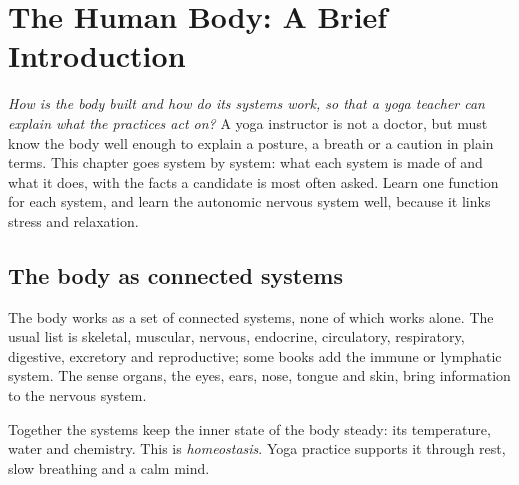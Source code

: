 \chapter{The Human Body: A Brief Introduction}
\label{ch:human-body}

\emph{How is the body built and how do its systems work, so that a yoga teacher can explain what the practices act on?}
A yoga instructor is not a doctor, but must know the body well enough to explain a posture, a breath or a caution in plain terms. This chapter goes system by system: what each system is made of and what it does, with the facts a candidate is most often asked. Learn one function for each system, and learn the autonomic nervous system well, because it links stress and relaxation.

\section{The body as connected systems}

The body works as a set of connected systems, none of which works alone. The usual list is skeletal, muscular, nervous, endocrine, circulatory, respiratory, digestive, excretory and reproductive; some books add the immune or lymphatic system. The sense organs, the eyes, ears, nose, tongue and skin, bring information to the nervous system.

Together the systems keep the inner state of the body steady: its temperature, water and chemistry. This is \emph{homeostasis}. Yoga practice supports it through rest, slow breathing and a calm mind.

